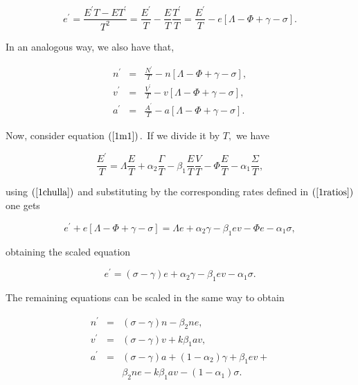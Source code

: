 \begin{equation}
e^{\prime }=\frac{E^{\prime }T-ET^{\prime }}{T^{2}}=\frac{E^{\prime }}{T}-
\frac{E}{T}\frac{T^{\prime }}{T}=\frac{E^{\prime }}{T}-e\left[ \Lambda -\Phi
+\gamma -\sigma \right] .  \label{1chulla}
\end{equation}

In an analogous way, we also have that,

\begin{eqnarray*}
n^{\prime } &=&\frac{N^{\prime }}{T}-n\left[ \Lambda -\Phi +\gamma -\sigma 
\right] , \\
v^{\prime } &=&\frac{V^{\prime }}{T}-v\left[ \Lambda -\Phi +\gamma -\sigma 
\right] , \\
a^{\prime } &=&\frac{A^{\prime }}{T}-a\left[ \Lambda -\Phi +\gamma -\sigma 
\right] .
\end{eqnarray*}

Now, consider equation $\left( \ref{1m1}\right) .$ If we divide it by $T,$ we
have

\[
\frac{E^{\prime }}{T}=\Lambda \frac{E}{T}+\alpha _{2}\frac{\Gamma }{T}-\beta
_{1}\frac{E}{T}\frac{V}{T}-\Phi \frac{E}{T}-\alpha _{1}\frac{\Sigma }{T}, 
\]

using $\left( \ref{1chulla}\right) $ and substituting by the corresponding
rates defined in $\left( \ref{1ratios}\right) $ one gets 

\[
e^{\prime }+e\left[ \Lambda -\Phi +\gamma -\sigma \right] =\Lambda e+\alpha
_{2}\gamma -\beta _{1}ev-\Phi e-\alpha _{1}\sigma , 
\]

obtaining the scaled equation

\begin{equation}
e^{\prime }=\left( \sigma -\gamma \right) e+\alpha _{2}\gamma -\beta
_{1}ev-\alpha _{1}\sigma .  \label{1sm1}
\end{equation}

The remaining equations can be scaled in the same way to obtain

\begin{eqnarray}
n^{\prime } &=&\left( \sigma -\gamma \right) n-\beta _{2}ne,  \label{1sm2} \\
v^{\prime } &=&\left( \sigma -\gamma \right) v+k\beta _{1}av,  \label{1sm3} \\
a^{\prime } &=&\left( \sigma -\gamma \right) a+\left( 1-\alpha _{2}\right)\gamma +\beta _{1}ev+ \label{1sm4} \\
            & &\beta _{2}ne-k\beta _{1}av-\left( 1-\alpha _{1}\right) \sigma. \nonumber 
\end{eqnarray}

